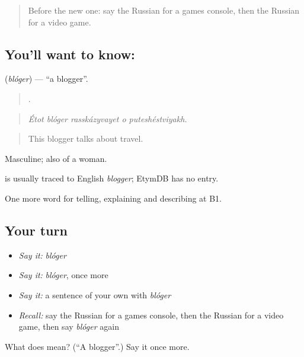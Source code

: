 \begin{quote}
Before the new one: say the Russian for a games console, then the Russian for a video game.
\end{quote}

\subsection*{You'll want to know: }
\textbf{} (\emph{blóger}) — \textquotedblleft{}a blogger\textquotedblright{}.

\begin{quote}
    .
\end{quote}

\begin{quote}
\emph{Étot blóger rasskázyvayet o puteshéstviyakh.}
\end{quote}

\begin{quote}
This blogger talks about travel.
\end{quote}

Masculine; also of a woman.

\begin{cousinweb}
\emph{} is usually traced to English \emph{blogger}; EtymDB has no entry.
\end{cousinweb}

\begin{grammarlens}[title={What you've built}]
One more word for telling, explaining and describing at B1.
\end{grammarlens}

\subsection*{Your turn}
\begin{itemize}
\raggedright
  \item \emph{Say it:} \emph{blóger}
  \item \emph{Say it:} \emph{blóger}, once more
  \item \emph{Say it:} a sentence of your own with \emph{blóger}
  \item \emph{Recall:} say the Russian for a games console, then the Russian for a video game, then say \emph{blóger} again
\end{itemize}

\begin{tcolorbox}[breakable,colback=teal!4,colframe=teal!35!black,title={Before you move on}]
What does  mean? (\textquotedblleft{}A blogger\textquotedblright{}.) Say it once more.
\end{tcolorbox}
